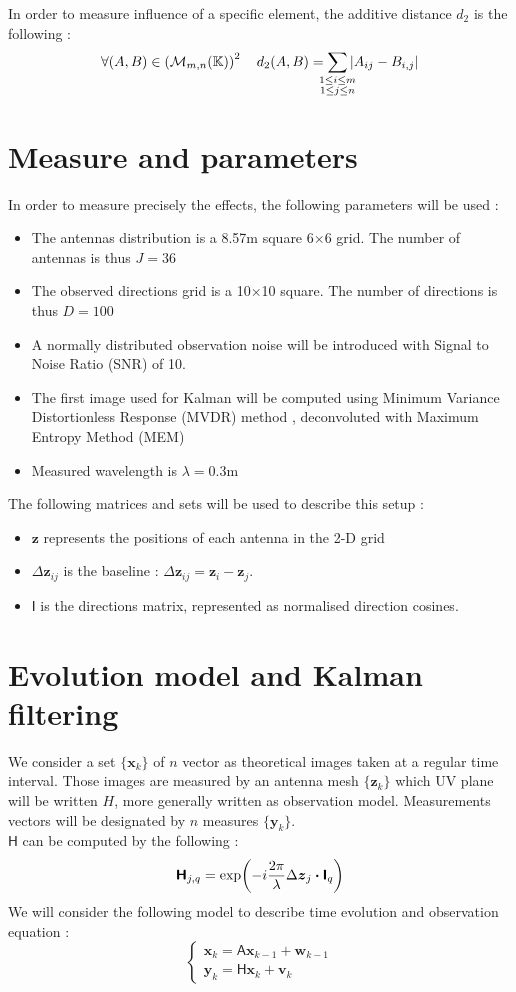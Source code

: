 \documentclass[titlepage]{article}
\newcommand{\w}{\boldsymbol{w}}
\renewcommand{\v}{\boldsymbol{v}}
\renewcommand{\H}{\boldsymbol{\mathsf{H}}}
\newcommand{\A}{\boldsymbol{\mathsf{A}}}
\newcommand{\I}{\boldsymbol{\mathsf{I}}}
\newcommand{\x}{\boldsymbol{x}}
\newcommand{\y}{\boldsymbol{y}}
\newcommand{\z}{\boldsymbol{z}}
\newcommand{\dz}{\Delta\boldsymbol{z}}
\begin{document}
	In order to measure influence of a specific element, the additive distance $d_2$ is the following :
	$$
	\forall(A,B)\in\left(\mathcal{M}_{m,n}(\mathbb{K})\right)^2\quad d_2(A,B) = \sum_{
		\mathclap{
			\substack{
				1\le i\le m \\1\le j\le n
			}
		}
	}\abs{A_{ij} - B_{i,j}}
	$$
	
	\section{Measure and parameters}
	
	In order to measure precisely the effects, the following parameters will be used :
	\begin{itemize}
		\item The antennas distribution is a 8.57m square 6$\times$6 grid. The number of antennas is thus $J = 36$
		\item The observed directions grid is a 10$\times$10 square. The number of directions is thus $D=100$
		\item A normally distributed observation noise will be introduced with Signal to Noise Ratio (SNR) of 10. 
		\item The first image used for Kalman will be computed using Minimum Variance Distortionless Response (MVDR) method \cite{bible}, deconvoluted with Maximum Entropy Method (MEM) \cite{MEM}
		\item Measured wavelength is $\lambda =0.3$m
	\end{itemize}

	The following matrices and sets will be used to describe this setup :
	\begin{itemize}
		\item $\z$ represents the positions of each antenna in the 2-D grid
		\item $\dz_{ij}$ is the baseline : $\dz_{ij} = \z_i - \z_j$. 
		\item $\I$ is the directions matrix, represented as normalised direction cosines.
	\end{itemize}
		
	\section{Evolution model and Kalman filtering}
	
	We consider a set $\{\x_k\}$ of $n$ vector as theoretical images taken at a regular time interval. Those images are measured by an antenna mesh $\{\z_k\}$ which UV plane will be written $H$, more generally written as observation model. Measurements vectors will be designated by $n$ measures $\{\y_k\}$.\\
	$\H$ can be computed by the following :
	\begin{equation}
		\H_{j,q} = \exp(-i\frac{2\pi}{\lambda}\dz_{j}\dotproduct\I_q)
	\end{equation}
	We will consider the following model to describe time evolution and observation equation :
	$$
		\begin{cases}
			\x_k = \A\x_{k-1} + \w_{k-1}\\
			\y_k = \H\x_k + \v_k
		\end{cases}
	$$
	
\end{document}
